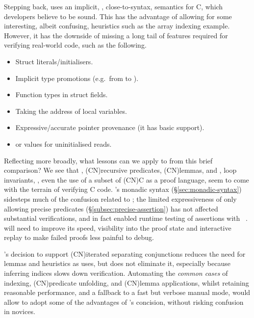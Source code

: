 Stepping back,  uses an implicit, \adhoc{}, close-to-syntax,
semantics for C, which developers believe to be sound. This has the advantage
of allowing for some interesting, albeit confusing, heuristics such as
the array indexing example. However, it has the downside of missing a long tail
of features required for verifying real-world code, such as the following.
\begin{itemize}
    \item Struct literals/initialisers.
    \item Implicit type promotions (e.g.\ from  to
        ).
    \item Function types in struct fields.
    \item Taking the address of local variables.
    \item Expressive/accurate pointer provenance (it has basic support).
    \item {} or  values for uninitialised reads.
\end{itemize}
Reflecting more broadly, what lessons can we apply to  from this brief
comparison? We see that ,  \kl(CN){recursive
predicates}, \kl(CN){lemmas},  and , loop
invariants, , even the use of a subset of \kl(CN){C as a
proof language}, seem to come with the terrain of verifying C code. 's
monadic syntax (\S\ref{sec:monadic-syntax}) sidesteps much of the confusion
related to ; the limited expressiveness of only allowing precise
predicates (\S\ref{subsec:precise-assertion}) has not affected substantial
verifications, and in fact enabled runtime testing of assertions with
~.  will need to improve
its speed, visibility into the proof state and interactive replay to make
failed proofs less painful to debug.

's decision to support \kl(CN){iterated separating conjunctions} reduces the
need for lemmas and heuristics as  uses, but does not eliminate
it, especially because inferring indices slows down verification. Automating
the \emph{common cases} of indexing, \kl(CN){predicate} unfolding, and
\kl(CN){lemma} applications, whilst retaining reasonable performance, and a
fallback to a fast but verbose manual mode, would allow  to adopt some
of the advantages of 's concision, without risking confusion in
novices.

